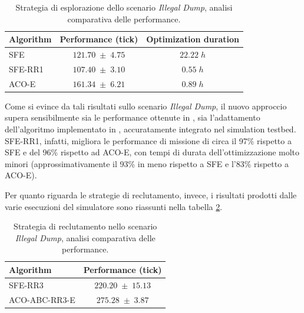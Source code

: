 \begin{table}[H]
    \centering
    \captionsetup{justification=centering, margin=2cm, font=footnotesize}
    \begin{tabular}{|l|c|c|}
    \hline
    \textbf{Algorithm}              & \textbf{Performance (tick)}       & \textbf{Optimization duration}      \\ \hline
    SFE                             & $121.70 \; \pm \; 4.75$           & $22.22 \; h$                                      \\ \hline
    SFE-RR1                         & $107.40 \; \pm \; 3.10$           & $0.55 \; h$                                       \\ \hline
    ACO-E                           & $161.34 \; \pm \; 6.21$           & $0.89 \; h$                                     \\ \hline
    \end{tabular}%
    
    \caption{Strategia di esplorazione dello scenario \textit{Illegal Dump}, analisi comparativa delle performance.}
    \label{analisi_comparativa_esplorazione_dump}
\end{table}

Come si evince da tali risultati sullo scenario \textit{Illegal Dump}, il nuovo approccio supera sensibilmente sia le performance ottenute in \cite{cimino2019adaptive}, sia l'adattamento dell'algoritmo implementato in \cite{palmieri2017comparison}, accuratamente integrato nel simulation testbed.
SFE-RR1, infatti, migliora le performance di missione di circa il 97\% rispetto a SFE e del 96\% rispetto ad ACO-E, con tempi di durata dell'ottimizzazione molto minori (approssimativamente il 93\% in meno rispetto a SFE e l'83\% rispetto a ACO-E).

Per quanto riguarda le strategie di reclutamento, invece, i risultati prodotti dalle varie esecuzioni del simulatore sono riassunti nella tabella \ref{analisi_comparativa_reclutamento_dump}.

\begin{table}[H]
    \centering
    \captionsetup{justification=centering, margin=2cm, font=footnotesize}
    \begin{tabular}{|l|c|}
    \hline
    \textbf{Algorithm}              & \textbf{Performance (tick)}       \\ \hline
    SFE-RR3                         & $220.20 \; \pm \; 15.13$           \\ \hline
    ACO-ABC-RR3-E                   & $275.28 \; \pm \; 3.87$           \\ \hline
    \end{tabular}%
    
    \caption{Strategia di reclutamento nello scenario \textit{Illegal Dump}, analisi comparativa delle performance.}
    \label{analisi_comparativa_reclutamento_dump}
\end{table}

